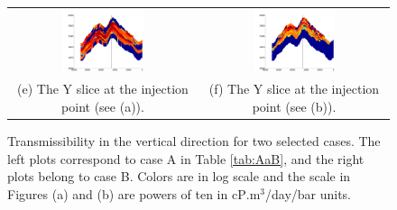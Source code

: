 \begin{figure}
\begin{tabular}{cc}
\includegraphics[width=0.45\textwidth]{./figurer/C02222_LogKz_slcy}&
\includegraphics[width=0.45\textwidth]{./figurer/C03211_LogKz_slcy}
\\(e) The Y slice at the injection point (see (a)).&
(f) The Y slice at the injection point (see (b)).
\end{tabular}
\caption{Transmissibility in the vertical direction for two selected cases. The left plots correspond to case A in Table \ref{tab:AaB}, and the right plots belong to case B. Colors are in log scale and the scale in Figures (a) and (b) are powers of ten in cP$.$m$^3$/day/bar units.}
\label{fig:Kz}
\end{figure}


